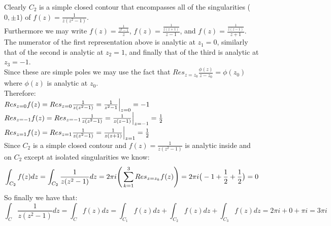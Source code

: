 \documentclass{article}
\begin{document}
\begin{center}
    \doublespacing
    Clearly $C_2$ is a simple closed contour that encompasses all of the singularities ($0,\pm 1$) of $f(z) =\frac{1}{z(z^2 - 1)}$.
    \\Furthermore we may write $f(z) =\frac{\frac{1}{z^2-1}}{z}$, $f(z) =\frac{\frac{1}{z(z+1)}}{z-1}$, and $f(z) =\frac{\frac{1}{z(z-1)}}{z+1}$.
    \\The numerator of the first representation above is analytic at $z_1 = 0$, similarly that of the second is analytic at $z_2 = 1$, and finally that of the third is analytic at $z_3 = -1$.
    \\Since these are simple poles we may use the fact that $Res_{z = z_0}\frac{\phi (z)}{z - z_0} =\phi (z_0)$ where $\phi (z)$ is analytic at $z_0$.
    \\Therefore:
    \\$Res_{z = 0} f(z) = Res_{z=0}\frac{1}{z(z^2 - 1)} =\frac{1}{z^2 - 1}\Big{|}_{z = 0} = -1$
    \\$Res_{z = -1} f(z) = Res_{z=-1}\frac{1}{z(z^2 - 1)} =\frac{1}{z(z-1)}\Big{|}_{z = -1} =\frac{1}{2}$
    \\$Res_{z = 1} f(z) = Res_{z=1}\frac{1}{z(z^2 - 1)} =\frac{1}{z(z+1)}\Big{|}_{z = 1} =\frac{1}{2}$
    \\Since $C_2$ is a simple closed contour and $f(z) =\frac{1}{z(z^2 - 1)}$ is analytic inside and on $C_2$ except at isolated singularities we know:
    \[\int _{C_2} f(z) dz =\int _{C_2}\frac{1}{z(z^2 - 1)} dz = 2\pi i\Bigg{(}\sum _{k=1}^3 Res_{z = z_k} f(z)\Bigg{)} = 2\pi i\big{(}-1 +\frac{1}{2} +\frac{1}{2}\big{)} = 0\]
    So finally we have that:
    \[\int _{C}\frac{1}{z(z^2 - 1)} dz =\int _{C} f(z) dz =\int _{C_1} f(z) dz +\int _{C_2} f(z) dz +\int _{C_3} f(z) dz = 2\pi i + 0 +\pi i = 3\pi i\]
\end{center}
\end{document}
